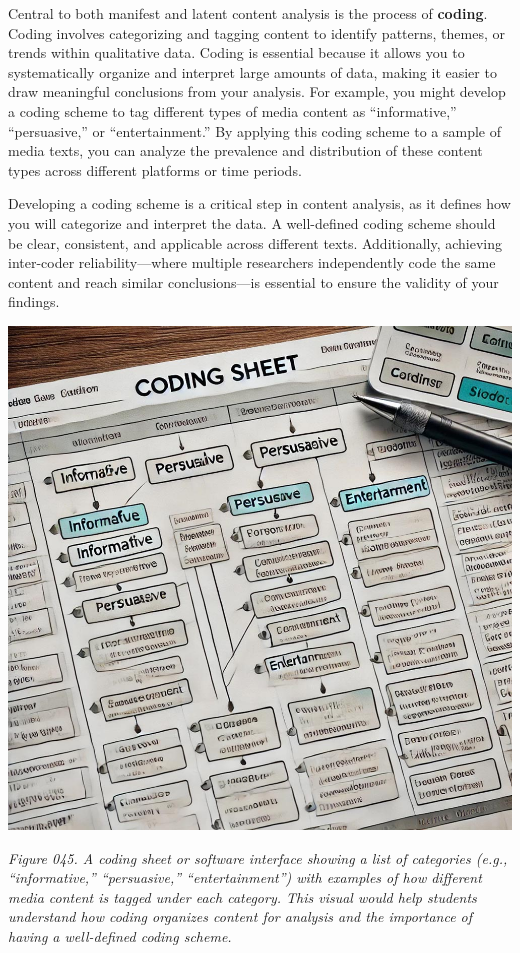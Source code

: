 \documentclass[
]{book}
\begin{document}
Central to both manifest and latent content analysis is the process of \textbf{coding}. Coding involves categorizing and tagging content to identify patterns, themes, or trends within qualitative data. Coding is essential because it allows you to systematically organize and interpret large amounts of data, making it easier to draw meaningful conclusions from your analysis. For example, you might develop a coding scheme to tag different types of media content as ``informative,'' ``persuasive,'' or ``entertainment.'' By applying this coding scheme to a sample of media texts, you can analyze the prevalence and distribution of these content types across different platforms or time periods.

Developing a coding scheme is a critical step in content analysis, as it defines how you will categorize and interpret the data. A well-defined coding scheme should be clear, consistent, and applicable across different texts. Additionally, achieving inter-coder reliability---where multiple researchers independently code the same content and reach similar conclusions---is essential to ensure the validity of your findings.

\includegraphics[width=1\linewidth,height=\textheight,keepaspectratio]{images/fig045.jpg}

\emph{Figure 045. A coding sheet or software interface showing a list of categories (e.g., ``informative,'' ``persuasive,'' ``entertainment'') with examples of how different media content is tagged under each category. This visual would help students understand how coding organizes content for analysis and the importance of having a well-defined coding scheme.}
\end{document}
